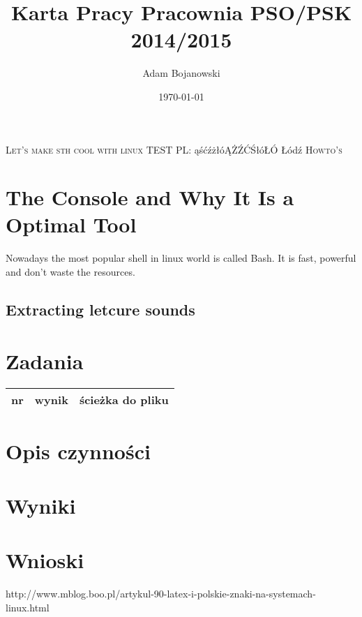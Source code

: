 \documentclass[a4paper,14pt,notitlepage,draft]{article}%
\title{Karta Pracy Pracownia PSO/PSK 2014/2015}
\author{Adam Bojanowski}
\date{\today}
\begin{document}
\maketitle
\textsc{\Large{Let's make sth cool with linux}}
TEST PL: ąśćźżłóĄŻŹĆŚłóŁÓ Łódź
\textsc{\huge{Howto's}}
\section{The Console and Why It Is a Optimal Tool}
Nowadays the most popular shell in linux world is called Bash. It is fast, powerful and don't waste the resources. 
\subsection{Extracting letcure sounds}
\section{Zadania}
	\begin{center}
		\begin{tabular}{|l|l|l|} %
		\hline
		nr & wynik & ścieżka do pliku\\
		\hline
		\end{tabular}
	\end{center}
\section{Opis czynności}
\section{Wyniki}
\section{Wnioski}




http://www.mblog.boo.pl/artykul-90-latex-i-polskie-znaki-na-systemach-linux.html
\tableofcontents
\end{document}

